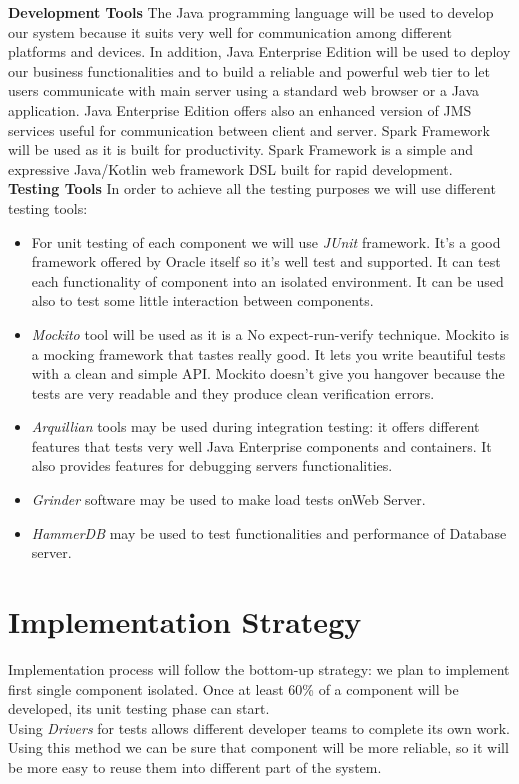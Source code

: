 \documentclass[a4paper, hidelinks, 12pt]{report}
\begin{document}
\textbf{Development Tools} The Java programming language will be used to develop our system because it suits very well for communication among different platforms and devices. In addition, Java Enterprise Edition will be used to deploy our business functionalities and to build a reliable and powerful web tier to let users communicate with main server using a standard web browser or a Java application. Java Enterprise Edition offers also an enhanced version of JMS services useful for communication between client and server. Spark Framework will be used as it is built for productivity. Spark Framework is a simple and expressive Java/Kotlin web framework DSL built for rapid development. \\

\textbf{Testing Tools} In order to achieve all the testing purposes we will use different testing tools:
\begin{itemize}
\item{} For unit testing of each component we will use \textit{JUnit} framework. It’s a good framework offered by Oracle itself so it’s well test and supported. It can test each functionality of component into an isolated environment. It can be used also to test some little interaction between components.
\item{}\textit{Mockito} tool will be used as it is a No expect-run-verify technique. Mockito is a mocking framework that tastes really good. It lets you write beautiful tests with a clean and simple API. Mockito doesn’t give you hangover because the tests are very readable and they produce clean verification errors.
\item{} \textit{Arquillian} tools may be used during integration testing: it offers different features that tests very well Java Enterprise components and containers. It also provides features for debugging servers functionalities.
\item{} \textit{Grinder} software may be used to make load tests onWeb Server.
\item{} \textit{HammerDB} may be used to test functionalities and performance of Database server.
\end{itemize}


\section{Implementation Strategy}
Implementation process will follow the bottom-up strategy: we plan to implement first single component isolated. Once at least 60\% of a component will be developed, its unit testing phase can start.\\
Using \textit{Drivers} for tests allows different developer teams to complete its own work. Using this method we can be sure that component will be more reliable, so it will be more easy to reuse them into different part of the system.\\
\end{document}
